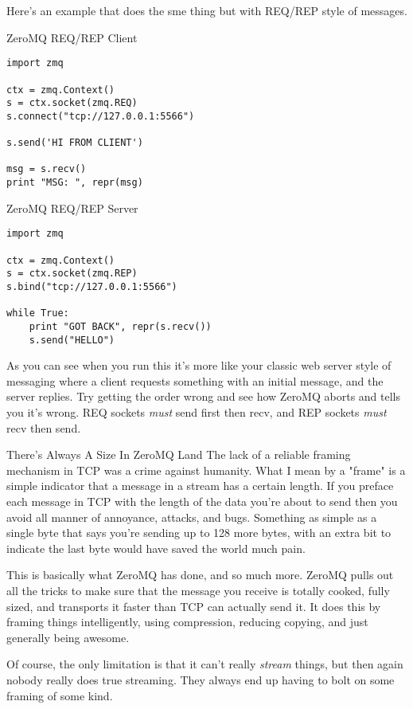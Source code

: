 Here's an example that does the sme thing but with REQ/REP style of messages.

\begin{code}{ZeroMQ REQ/REP Client}
\begin{Verbatim}
import zmq

ctx = zmq.Context()
s = ctx.socket(zmq.REQ)
s.connect("tcp://127.0.0.1:5566")

s.send('HI FROM CLIENT')

msg = s.recv()
print "MSG: ", repr(msg)
\end{Verbatim}
\end{code}


\begin{code}{ZeroMQ REQ/REP Server}
\begin{Verbatim}
import zmq

ctx = zmq.Context()
s = ctx.socket(zmq.REP)
s.bind("tcp://127.0.0.1:5566")

while True:
    print "GOT BACK", repr(s.recv())
    s.send("HELLO")
\end{Verbatim}
\end{code}

As you can see when you run this it's more like your classic web server style of messaging
where a client requests something with an initial message, and the server replies.  Try getting
the order wrong and see how ZeroMQ aborts and tells you it's wrong.  REQ sockets \emph{must} send
first then recv, and REP sockets \emph{must} recv then send.

\begin{aside}{There's Always A Size In ZeroMQ Land}
The lack of a reliable framing mechanism in TCP was a crime against humanity.  What I mean by a
"frame" is a simple indicator that a message in a stream has a certain length.  If you preface
each message in TCP with the length of the data you're about to send then you avoid all manner
of annoyance, attacks, and bugs.  Something as simple as a single byte that says you're sending up
to 128 more bytes, with an extra bit to indicate the last byte would have saved the world much
pain.

This is basically what ZeroMQ has done, and so much more.  ZeroMQ pulls out all the tricks to make
sure that the message you receive is totally cooked, fully sized, and transports it faster than
TCP can actually send it.  It does this by framing things intelligently, using compression, reducing
copying, and just generally being awesome.

Of course, the only limitation is that it can't really \emph{stream} things, but then again nobody
really does true streaming.  They always end up having to bolt on some framing of some kind.
\end{aside}



